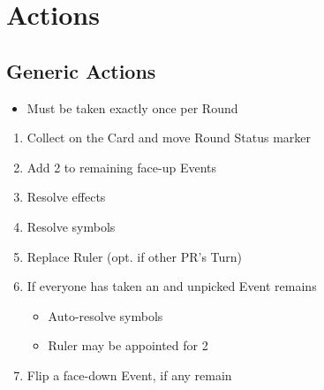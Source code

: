 \documentclass[10pt]{article}
\begin{document}
\addfooter

\section*{Actions}
\subsection*{Generic Actions}

\begin{itemize}
	\item Must be taken exactly once per Round
\end{itemize}
\begin{enumerate}
	\item Collect \ducats on the Card and move Round Status marker
	\item Add 2 \ducats to remaining face-up Events
	\item Resolve effects
	\item Resolve symbols
	\item Replace Ruler (opt. if other PR's Turn)
	\item If everyone has taken an  and unpicked Event remains
	\begin{itemize}
		\item Auto-resolve symbols
		\item Ruler may be appointed for 2\adminpower
	\end{itemize}
	\item Flip a face-down Event, if any remain
\end{enumerate}
\end{document}
